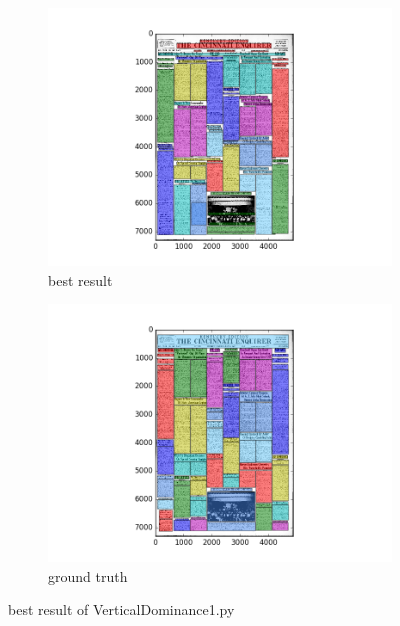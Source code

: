 \documentclass[a4paper,10pt]{article}
\begin{document}
					\begin{figure}
					\centering
					\begin{subfigure}{.5\textwidth}
					  \centering
					  \includegraphics[width=10cm]
					{VerticalDominance1.py.best.png}
					  \caption{best result}
					  \label{fig:sub1}
					\end{subfigure}%
					\begin{subfigure}{.5\textwidth}
					  \centering
					  \includegraphics[width=10cm]
					{VerticalDominance1.py.gt.best.png}
					  \caption{ground truth}
					  \label{fig:sub2}
					\end{subfigure}
					\caption
					{best result of VerticalDominance1.py}
					\label{fig:test}
					\end{figure}
					
\end{document}
